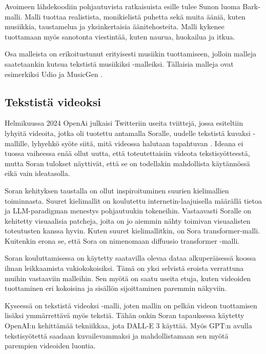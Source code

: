 Avoimeen lähdekoodiin pohjautuvista ratkaisuista esille tulee Sunon luoma
Bark-malli. Malli tuottaa realistista, monikielistä puhetta sekä muita ääniä,
kuten musiikkia, taustamelua ja yksinkertaisia äänitehosteita. Malli kykenee
tuottamaan myös sanotonta viestintää, kuten naurua, huokailua ja itkua.
\parencite{githubSunoAiBark}

Osa malleista on erikoitustunut erityisesti musiikin tuottamiseen, jolloin
malleja saatetaankin kutsua tekstistä musiikiksi -malleiksi. Tällaisia malleja
ovat esimerkiksi Udio \parencite{udioAboutUs} ja MusicGen
\parencite{copet2024simplecontrollablemusicgeneration}.

\subsection{Tekstistä videoksi}

Helmikuussa 2024 OpenAi julkaisi Twitteriin useita tviittejä, jossa esiteltiin
lyhyitä videoita, jotka oli tuotettu antamalla Soralle, uudelle tekstistä
kuvaksi -mallille, lyhyehkö syöte siitä, mitä videossa halutaan tapahtuvan
\parencite{twitter1758192957386342435}. Ideana ei tuossa vaiheessa enää ollut
uutta, että toteutettaisiin videota tekstisyötteestä, mutta Soran tulokset
näyttivät, että se on todellakin mahdollista käytännössä eikä vain ideatasolla.

Soran kehityksen taustalla on ollut inspiroituminen suurien kielimallien
toiminnasta. Suuret kielimallit on koulutettu internetin-laajuisella määrällä
tietoa ja LLM-paradigman menestys pohjautuukin tokeneihin. Vastaavasti Soralle
on kehitetty visuaalisia patcheja, joita on jo aiemmin nähty toimivan
visuaalisten toteutusten kanssa hyvin. Kuten suuret kielimallitkin, on Sora
transformer-malli. Kuitenkin erona se, että Sora on nimenomaan diffuusio
transformer -malli. \parencite{openAISoraReport}

Soran kouluttamisessa on käytetty saatavilla olevaa dataa alkuperäisessä koossa
ilman leikkaamista vakiokokoisiksi. Tämä on yksi selvistä eroista verrattuna
muihin vastaaviin malleihin. Sen myötä on saatu useita etuja, kuten videoiden
tuottaminen eri kokoisina ja sisällön sijoittaminen paremmin näkyviin.
\parencite{openAISoraReport}

Kyseessä on tekstistä videoksi -malli, joten mallin on pelkän videon
tuottamisen lisäksi ymmärrettävä myös tekstiä. Tähän onkin Soran tapauksessa
käytetty OpenAI:n kehittämää tekniikkaa, jota DALL-E 3 käyttää. Myös GPT:n
avulla tekstisyötettä saadaan kuvailevammaksi ja mahdollistamaan sen myötä
parempien videoiden luontia. \parencite{openAISoraReport}

